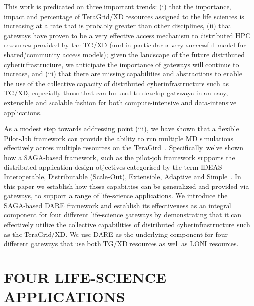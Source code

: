\documentclass{sig-alternate}
\begin{document}
This work is predicated on three important trends: (i) that the
importance, impact and percentage of TeraGrid/XD resources assigned to
the life sciences is increasing at a rate that is probably greater
than other disciplines, (ii) that gateways have proven to be a very
effective access mechanism to distributed HPC resources provided by
the TG/XD (and in particular a very successful model for
shared/community access models); given the landscape of the future
distributed cyberinfrastructure, we anticipate the importance of
gateways will continue to increase, and (iii) that there are missing
capabilities and abstractions to enable the use of the collective
capacity of distributed cyberinfrastructure such as TG/XD, especially
those that can be used to develop gateways in an easy, extensible and
scalable fashion for both compute-intensive and data-intensive
applications.

As a modest step towards addressing point (iii), we have shown that a
flexible Pilot-Job framework can provide the ability to run multiple
MD simulations effectively across multiple resources on the
TeraGird~\cite{saga-royalsoc, saga-ccgrid10}. Specifically, we've
shown how a SAGA-based framework, such as the pilot-job framework
supports the distributed application design objectives categorised by
the term IDEAS -- Interoperable, Distributable (Scale-Out),
Extensible, Adaptive and Simple~\cite{ideas}.  In this paper we
establish how these capabilties can be generalized and provided via
gateways, to support a range of life-science applications.  We
introduce the SAGA-based DARE framework and establish its
effectiveness as an integral component for four different life-science
gateways by demonstrating that it can effectively utilize the
collective capabilities of distributed cyberinfrastructure such as the
TeraGrid/XD. We use DARE as the underlying component for four
different gateways that use both TG/XD resources as well as LONI
resources.



\section{FOUR LIFE-SCIENCE APPLICATIONS}
\end{document}
